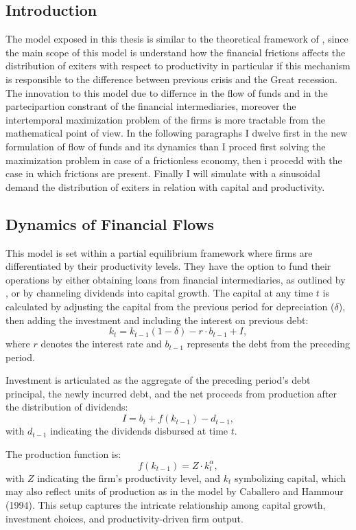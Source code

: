 \documentclass[12pt]{article}
\begin{document}
\subsection{Introduction}
The model exposed in this thesis is similar to the theoretical framework of \cite{OsePap17}, since the main scope of
this model is understand how the financial frictions affects the distribution of exiters with respect to productivity in
particular if this mechanism is responsible to the difference between previous crisis and the Great recession. The
innovation to this model due to differnce in the flow of funds and in the partecipartion constrant of the financial
intermediaries, moreover the intertemporal maximization problem of the firms is more tractable from the mathematical
point of view. In the following paragraphs I dwelve first in the new formulation of flow of funds and its dynamics than
I proced first solving the maximization problem in case of a frictionless economy, then i procedd with the case in which
frictions are present. Finally I will simulate with a sinusoidal demand the distribution of exiters in relation with
capital and productivity.

\subsection{Dynamics of Financial Flows}

This model is set within a partial equilibrium framework where firms are differentiated by their productivity levels.
They have the option to fund their operations by either obtaining loans from financial intermediaries, as outlined by
\cite{bernanke1995inside}, or by channeling dividends into capital growth. The capital at any time \(t\) is calculated by
adjusting the capital from the previous period for depreciation (\(\delta\)), then adding the investment and including
the interest on previous debt: 
\[k_t = k_{t-1}(1 - \delta) - r \cdot b_{t-1} + I,\]
where \(r\) denotes the interest rate and \(b_{t-1}\) represents the debt from the preceding period.

Investment is articulated as the aggregate of the preceding period's debt principal, the newly incurred debt, and the
net proceeds from production after the distribution of dividends: 
\[I = b_{t} + f(k_{t-1}) - d_{t-1},\]
with \(d_{t-1}\) indicating the dividends disbursed at time \(t\).

The production function is:
\[f(k_{t-1}) = Z \cdot k_t^\alpha,\]
with \(Z\) indicating the firm's productivity level, and \(k_t\) symbolizing capital, which may also reflect units of
production as in the model by Caballero and Hammour (1994). This setup captures the intricate relationship among capital
growth, investment choices, and productivity-driven firm output. 
\end{document}
